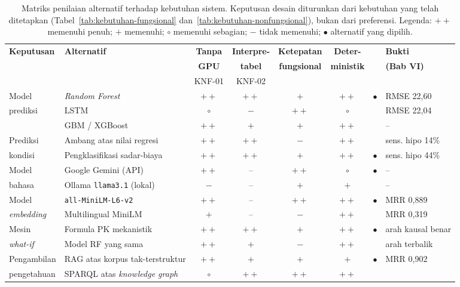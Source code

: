 \begin{table}[htbp]
\centering
\caption{Matriks penilaian alternatif terhadap kebutuhan sistem. Keputusan desain diturunkan dari kebutuhan yang telah ditetapkan (Tabel~\ref{tab:kebutuhan-fungsional} dan~\ref{tab:kebutuhan-nonfungsional}), bukan dari preferensi. Legenda: $++$ memenuhi penuh; $+$ memenuhi; $\circ$ memenuhi sebagian; $-$ tidak memenuhi; $\bullet$ alternatif yang dipilih.}
\label{tab:matriks-solusi}
\small
\begin{tabular}{@{}llcccccl@{}}
\toprule
\textbf{Keputusan} & \textbf{Alternatif} & \textbf{Tanpa} & \textbf{Interpre-} & \textbf{Ketepatan} & \textbf{Deter-} & & \textbf{Bukti} \\
 & & \textbf{GPU} & \textbf{tabel} & \textbf{fungsional} & \textbf{ministik} & & \textbf{(Bab VI)} \\
 & & \footnotesize KNF-01 & \footnotesize KNF-02 & & & & \\
\midrule
Model            & \emph{Random Forest}            & $++$ & $++$ & $+$  & $++$ & $\bullet$ & RMSE 22,60 \\
prediksi         & LSTM                            & $\circ$ & $-$ & $++$ & $\circ$ & & RMSE 22,04 \\
                 & GBM / XGBoost                   & $++$ & $+$  & $+$  & $++$ & & -- \\
\midrule
Prediksi         & Ambang atas nilai regresi       & $++$ & $++$ & $-$  & $++$ & & sens. hipo 14\% \\
kondisi          & Pengklasifikasi sadar-biaya     & $++$ & $++$ & $+$  & $++$ & $\bullet$ & sens. hipo 44\% \\
\midrule
Model            & Google Gemini (API)             & $++$ & -- & $++$ & $\circ$ & $\bullet$ & -- \\
bahasa           & Ollama \texttt{llama3.1} (lokal) & $-$ & -- & $+$  & $+$ & & -- \\
\midrule
Model            & \texttt{all-MiniLM-L6-v2}       & $++$ & -- & $++$ & $++$ & $\bullet$ & MRR 0,889 \\
\emph{embedding} & Multilingual MiniLM             & $+$  & -- & $-$  & $++$ & & MRR 0,319 \\
\midrule
Mesin            & Formula PK mekanistik           & $++$ & $++$ & $+$ & $++$ & $\bullet$ & arah kausal benar \\
\emph{what-if}   & Model RF yang sama              & $++$ & $+$  & $-$ & $++$ & & arah terbalik \\
\midrule
Pengambilan      & RAG atas korpus tak-terstruktur & $++$ & $+$  & $+$ & $+$ & $\bullet$ & MRR 0,902 \\
pengetahuan      & SPARQL atas \emph{knowledge graph} & $\circ$ & $++$ & $++$ & $++$ & & \autocite{rad2024} \\
\bottomrule
\end{tabular}


\end{table}
